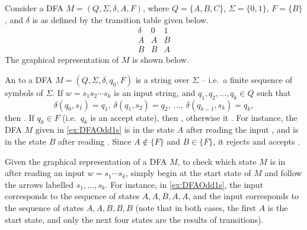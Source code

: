 \begin{Example}\label{ex:DFAOdd1s}
Consider a DFA $M = (Q, \Sigma, \delta, A, F)$, where $Q = \{A, B, C\}$, $\Sigma = \{0, 1\}$, $F = \{B\}$, and $\delta$ is as defined by the transition table given below.
\begin{equation*}
\begin{array}{r|cc}
\delta & 0 & 1 \\
\hline
A & A & B \\
B & B & A
\end{array}
\end{equation*}
The graphical representation of $M$ is shown below.
\begin{center}
\end{center}
\end{Example}

An  to a DFA $M = (Q, \Sigma, \delta, q_0, F)$ is a string over $\Sigma$ -- i.e.\ a finite sequence of symbols of $\Sigma$. If $w = s_1 s_2 \cdots s_k$ is an input string, and $q_1, q_2, \ldots, q_k \in Q$ such that
\begin{equation*}
\delta(q_0, s_1) = q_1,~ \delta(q_1, s_2) = q_2,~ \ldots,~ \delta(q_{k-1}, s_k) = q_k,
\end{equation*}
then . If $q_k \in F$ (i.e.\ $q_k$ is an accept state), then , otherwise it . For instance, the DFA $M$ given in \cref{ex:DFAOdd1s} is in the state $A$ after reading the input , and is in the state $B$ after reading . Since $A \notin \{F\}$ and $B \in \{F\}$, it rejects  and accepts .

Given the graphical representation of a DFA $M$, to check which state $M$ is in after reading an input $w = s_1 \cdots s_k$, simply begin at the start state of $M$ and follow the arrows labelled $s_1, \ldots, s_k$. For instance, in \cref{ex:DFAOdd1s}, the input  corresponds to the sequence of states $A, A, B, A, A$, and the input  corresponds to the sequence of states $A, A, B, B, B$ (note that in both cases, the first $A$ is the start state, and only the next four states are the results of transitions).

